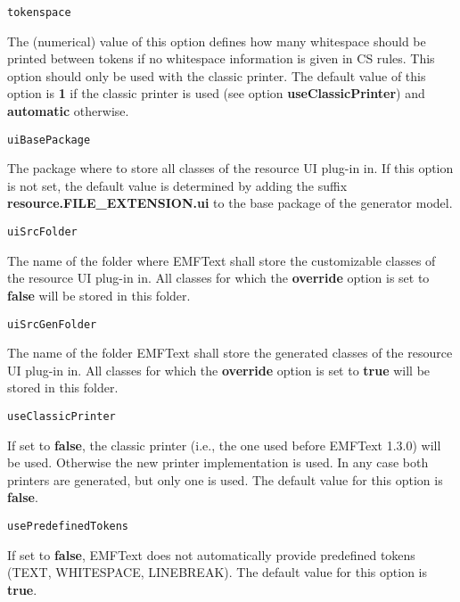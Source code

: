 \noindent\texttt{tokenspace}
\begin{myindentpar}{1cm}
The (numerical) value of this option defines how many whitespace should be printed between tokens if no whitespace information is given in CS rules. This option should only be used with the classic printer. The default value of this option is \textbf{1} if the classic printer is used (see option \textbf{useClassicPrinter}) and \textbf{automatic} otherwise.
\end{myindentpar}

\noindent\texttt{uiBasePackage}
\begin{myindentpar}{1cm}
The package where to store all classes of the resource UI plug-in in. If this option is not set, the default value is determined by adding the suffix \textbf{resource.FILE\_EXTENSION.ui} to the base package of the generator model.
\end{myindentpar}

\noindent\texttt{uiSrcFolder}
\begin{myindentpar}{1cm}
The name of the folder where EMFText shall store the customizable classes of the resource UI plug-in in. All classes for which the \textbf{override} option is set to \textbf{false} will be stored in this folder.
\end{myindentpar}

\noindent\texttt{uiSrcGenFolder}
\begin{myindentpar}{1cm}
The name of the folder EMFText shall store the generated classes of the resource UI plug-in in. All classes for which the \textbf{override} option is set to \textbf{true} will be stored in this folder.
\end{myindentpar}

\noindent\texttt{useClassicPrinter}
\begin{myindentpar}{1cm}
If set to \textbf{false}, the classic printer (i.e., the one used before EMFText 1.3.0) will be used. Otherwise the new printer implementation is used. In any case both printers are generated, but only one is used. The default value for this option is \textbf{false}.
\end{myindentpar}

\noindent\texttt{usePredefinedTokens}
\begin{myindentpar}{1cm}
If set to \textbf{false}, EMFText does not automatically provide predefined tokens (TEXT, WHITESPACE, LINEBREAK). The default value for this option is \textbf{true}.
\end{myindentpar}

